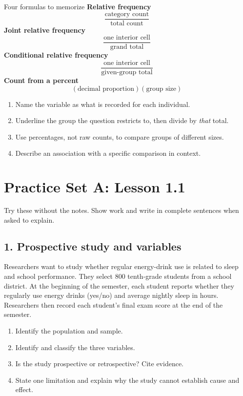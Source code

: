 \documentclass[11pt]{article}
\newcommand{\workline}{\vspace{0.33in}\hrulefill}
\begin{document}
\begin{minipage}[t]{0.39\textwidth}
\vspace{0pt}
\begin{formulabox}{Four formulas to memorize}
\small
\textbf{Relative frequency}
\[
\frac{\text{category count}}{\text{total count}}
\]
\textbf{Joint relative frequency}
\[
\frac{\text{one interior cell}}{\text{grand total}}
\]
\textbf{Conditional relative frequency}
\[
\frac{\text{one interior cell}}{\text{given-group total}}
\]
\textbf{Count from a percent}
\[
(\text{decimal proportion})(\text{group size})
\]
\end{formulabox}

\begin{trapbox}
\small
\begin{enumerate}[label=\arabic*.]
  \item Name the variable as what is recorded for each individual.
  \item Underline the group the question restricts to, then divide by \emph{that} total.
  \item Use percentages, not raw counts, to compare groups of different sizes.
  \item Describe an association with a specific comparison in context.
\end{enumerate}
\end{trapbox}
\end{minipage}

\newpage
\section{Practice Set A: Lesson 1.1}
Try these without the notes. Show work and write in complete sentences when asked to explain.

\subsection*{1. Prospective study and variables}
Researchers want to study whether regular energy-drink use is related to sleep and school performance. They select 800 tenth-grade students from a school district. At the beginning of the semester, each student reports whether they regularly use energy drinks (yes/no) and average nightly sleep in hours. Researchers then record each student's final exam score at the end of the semester.

\begin{enumerate}[label=\alph*.]
  \item Identify the population and sample.
  \workline
  \item Identify and classify the three variables.
  \workline
  \item Is the study prospective or retrospective? Cite evidence.
  \workline
  \item State one limitation and explain why the study cannot establish cause and effect.
  \workline
\end{enumerate}
\end{document}
